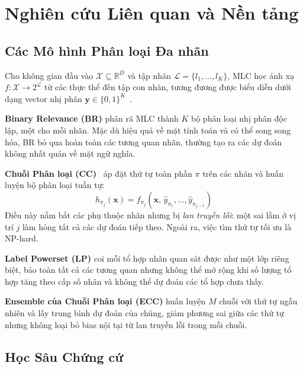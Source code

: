 \documentclass[conference]{IEEEtran}
\begin{document}
\section{Nghiên cứu Liên quan và Nền tảng}

\subsection{Các Mô hình Phân loại Đa nhãn}

Cho không gian đầu vào $\mathcal{X} \subseteq \mathbb{R}^D$ và tập nhãn $\mathcal{L} = \{l_1, \ldots, l_K\}$, MLC học ánh xạ $f: \mathcal{X} \to 2^{\mathcal{L}}$ từ các thực thể đến tập con nhãn, tương đương được biểu diễn dưới dạng vector nhị phân $\mathbf{y} \in \{0, 1\}^K$~\cite{tsoumakas2007multi,zhang2014review}.

\textbf{Binary Relevance (BR)} phân rã MLC thành $K$ bộ phân loại nhị phân độc lập, một cho mỗi nhãn. Mặc dù hiệu quả về mặt tính toán và có thể song song hóa, BR bỏ qua hoàn toàn các tương quan nhãn, thường tạo ra các dự đoán không nhất quán về mặt ngữ nghĩa.

\textbf{Chuỗi Phân loại (CC)}~\cite{read2011classifier} áp đặt thứ tự toàn phần $\pi$ trên các nhãn và huấn luyện bộ phân loại tuần tự:
\begin{equation}
    h_{\pi_j}(\mathbf{x}) = f_{\pi_j}\!\left(\mathbf{x},\, \hat{y}_{\pi_1}, \ldots, \hat{y}_{\pi_{j-1}}\right)
\end{equation}
Điều này nắm bắt các phụ thuộc nhãn nhưng bị \textit{lan truyền lỗi}: một sai lầm ở vị trí $j$ làm hỏng tất cả các dự đoán tiếp theo. Ngoài ra, việc tìm thứ tự tối ưu là NP-hard.

\textbf{Label Powerset (LP)} coi mỗi tổ hợp nhãn quan sát được như một lớp riêng biệt, bảo toàn tất cả các tương quan nhưng không thể mở rộng khi số lượng tổ hợp tăng theo cấp số nhân và không thể dự đoán các tổ hợp chưa thấy.

\textbf{Ensemble của Chuỗi Phân loại (ECC)} huấn luyện $M$ chuỗi với thứ tự ngẫu nhiên và lấy trung bình dự đoán của chúng, giảm phương sai giữa các thứ tự nhưng không loại bỏ bias nội tại từ lan truyền lỗi trong mỗi chuỗi.

\subsection{Học Sâu Chứng cứ}
\end{document}
